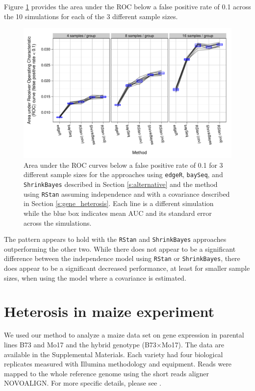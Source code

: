 \documentclass[useAMS,usenatbib,referee]{biom}
\begin{document}
Figure \ref{f:auc} provides the area under the ROC below a false positive rate of 0.1 across the 10 simulations for each of the 3 different sample sizes. 
\begin{figure}
\centerline{\includegraphics[width=\textwidth]{auc-facet-TRUE}}
\caption{Area under the ROC curves below a false positive rate of 0.1 for 3 different sample sizes for the approaches using {\tt edgeR}, {\tt baySeq},  and {\tt ShrinkBayes} described in Section \ref{s:alternative} and the method using {\tt RStan} assuming independence and with a covariance described in Section \ref{s:gene_heterosis}. Each line is a different simulation while the blue box indicates mean AUC and its standard error across the simulations.}
\label{f:auc}
\end{figure}
The pattern appears to hold with the {\tt RStan} and {\tt ShrinkBayes} approaches outperforming the other two. While there does not appear to be a significant difference between the independence model using {\tt RStan} or {\tt ShrinkBayes}, there does appear to be a significant decreased performance, at least for smaller sample sizes, when using the model where a covariance is estimated. 


\section{Heterosis in maize experiment}
\label{s:corn}

We used our method to analyze a maize data set on gene expression in parental lines B73 and Mo17 and the hybrid genotype (B73$\times$Mo17). The data are available in the Supplemental Materials. Each variety had four biological replicates measured with Illumina methodology and equipment. Reads were mapped to the whole reference genome using the short reads aligner NOVOALIGN. For more specific details, please see \cite{paschold2012complementation}. 
\end{document}
